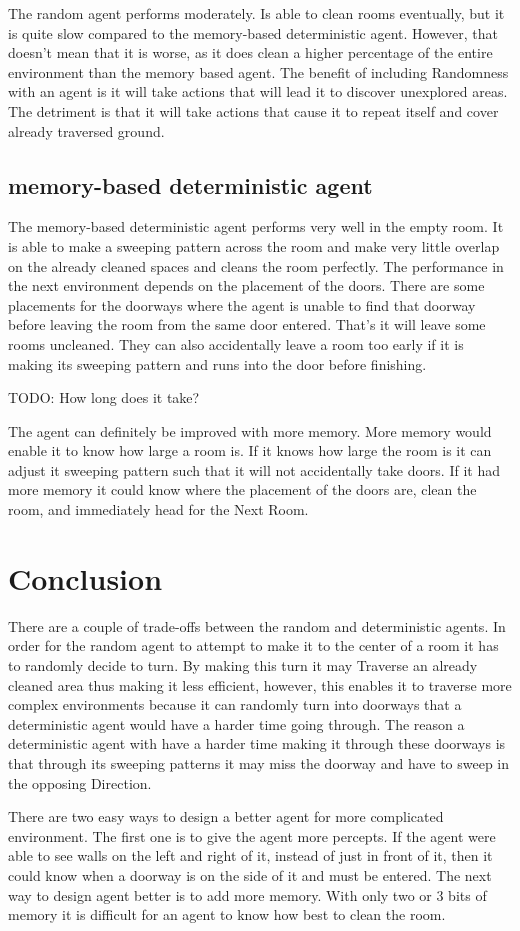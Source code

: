 \documentclass{article} %
\begin{document}
The random agent performs moderately. Is able to clean rooms eventually, but it is quite slow compared to the memory-based deterministic agent. However, that doesn't mean that it is worse, as it does clean a higher percentage of the entire environment than the memory based agent. 
The benefit of including Randomness with an agent is it will take actions that will lead it to discover unexplored areas. The detriment is that it will take actions that cause it to repeat itself and cover already traversed ground. 

\subsection{memory-based deterministic agent}
The memory-based deterministic agent performs very well in the empty room. It is able to make a sweeping pattern across the room and make very little overlap on the already cleaned spaces and cleans the room perfectly.  The performance in the next environment depends on the placement of the doors. There are some placements for the doorways where the agent is unable to find that doorway before leaving the room from the same door entered. That's it will leave some rooms uncleaned. They can also accidentally leave a room too early if it is making its sweeping pattern and runs into the door before finishing. \par

TODO: How long does it take? \par

The agent can definitely be improved with more memory. More memory would enable it to know how large a room is. If it knows how large the room is it can adjust it sweeping pattern such that it will not accidentally take doors. If it had more memory it could know where the placement of the doors are, clean the room, and immediately head for the Next Room.

\section{Conclusion}
There are a couple of trade-offs between the random and deterministic agents. In order for the random agent to attempt to make it to the center of a room it has to randomly decide to turn. By making this turn it may Traverse an already cleaned area thus making it less efficient, however, this enables it to traverse more complex environments because it can randomly turn into doorways that a deterministic agent would have a harder time going through. The reason a deterministic agent with have a harder time making it through these doorways is that through its sweeping patterns it may miss the doorway and have to sweep in the opposing Direction. \par
There are two easy ways to design a better agent for more complicated environment. The first one is to give the agent more percepts. If the agent were able to see walls on the left and right of it, instead of just in front of it, then it could know when a doorway is on the side of it and must be entered. The next way to design agent better is to add more memory. With only two  or 3 bits of memory it is difficult for an agent to know how best to clean the room. \par
\end{document}
